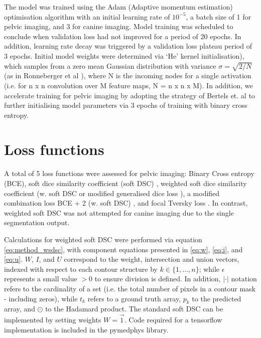 The model was trained using the Adam (Adaptive momentum estimation) optimisation algorithm \cite{kingma2014} with an initial learning rate of $10^{-5}$, a batch size of 1 for pelvic imaging, and 3 for canine imaging. Model training was scheduled to conclude when validation loss had not improved for a period of 20 epochs. In addition, learning rate decay was triggered by a validation loss plateau period of 3 epochs. Initial model weights were determined via `He' kernel initialisation), which samples from a zero mean Gaussian distribution with variance $\sigma=\sqrt{2/N}$ (as in Ronneberger et al \cite{Ronneberger_2015}), where N is the incoming nodes for a single activation (i.e. for n x n convolution over M feature maps, N = n x n x M). In addition, we accelerate training for pelvic imaging by adopting the strategy of Bertels et. al to further initialising model parameters via 3 epochs of training with binary cross entropy.



\section{Loss functions}
\label{ch:method-loss}
A total of 5 loss functions were assessed for pelvic imaging: Binary Cross entropy (BCE), soft dice similarity coefficient (soft DSC) \cite{Bertels2019}, weighted soft dice similarity coefficient (w. soft DSC or modified generalised dice loss \cite{Sudre_2017}), a modified combination loss BCE + 2 (w. soft DSC) \cite{taghanaki2018}, and focal Tversky loss \cite{Zhu_2018, Khan2019, abraham2018}. In contrast, weighted soft DSC was not attempted for canine imaging due to the single segmentation output.

Calculations for weighted soft DSC were performed via equation \ref{eq:method_wsdsc}, with component equations presented in \ref{eq:w}, \ref{eq:i}, and \ref{eq:u}. $W$, $I$, and $U$ correspond to the weight, intersection and union vectors, indexed with respect to each contour structure by $k\in\{1,...,n\}$; while $\epsilon$ represents a small value $>0$ to ensure division is defined. In addition, $|\cdot|$ notation refers to the cardinality of a set (i.e. the total number of pixels in a contour mask - including zeros), while $t_{k}$ refers to a ground truth array, $p_{k}$ to the predicted array, and $\odot$ to the Hadamard product. The standard soft DSC can be implemented by setting weights $W=\vec{1}$.  Code required for a tensorflow implementation is included in the pymedphys library.

